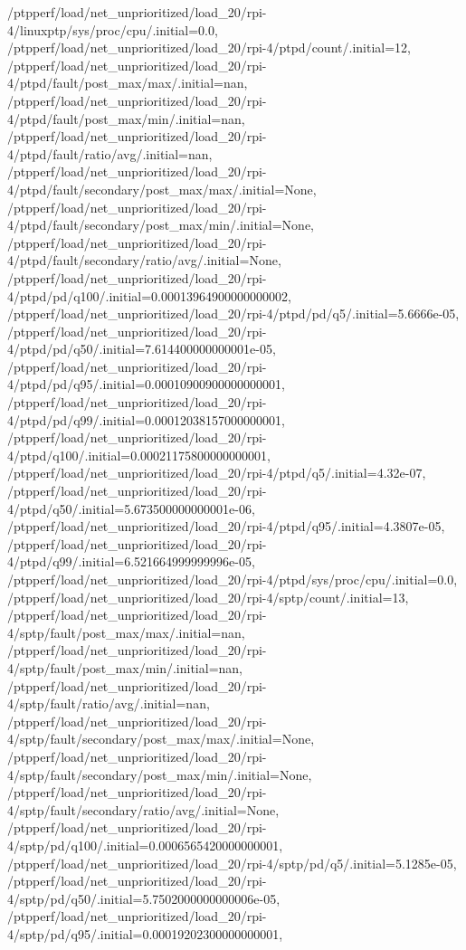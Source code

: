 {    /ptpperf/load/net_unprioritized/load_20/rpi-4/linuxptp/sys/proc/cpu/.initial=0.0,
    /ptpperf/load/net_unprioritized/load_20/rpi-4/ptpd/count/.initial=12,
    /ptpperf/load/net_unprioritized/load_20/rpi-4/ptpd/fault/post_max/max/.initial=nan,
    /ptpperf/load/net_unprioritized/load_20/rpi-4/ptpd/fault/post_max/min/.initial=nan,
    /ptpperf/load/net_unprioritized/load_20/rpi-4/ptpd/fault/ratio/avg/.initial=nan,
    /ptpperf/load/net_unprioritized/load_20/rpi-4/ptpd/fault/secondary/post_max/max/.initial=None,
    /ptpperf/load/net_unprioritized/load_20/rpi-4/ptpd/fault/secondary/post_max/min/.initial=None,
    /ptpperf/load/net_unprioritized/load_20/rpi-4/ptpd/fault/secondary/ratio/avg/.initial=None,
    /ptpperf/load/net_unprioritized/load_20/rpi-4/ptpd/pd/q100/.initial=0.00013964900000000002,
    /ptpperf/load/net_unprioritized/load_20/rpi-4/ptpd/pd/q5/.initial=5.6666e-05,
    /ptpperf/load/net_unprioritized/load_20/rpi-4/ptpd/pd/q50/.initial=7.614400000000001e-05,
    /ptpperf/load/net_unprioritized/load_20/rpi-4/ptpd/pd/q95/.initial=0.00010900900000000001,
    /ptpperf/load/net_unprioritized/load_20/rpi-4/ptpd/pd/q99/.initial=0.00012038157000000001,
    /ptpperf/load/net_unprioritized/load_20/rpi-4/ptpd/q100/.initial=0.00021175800000000001,
    /ptpperf/load/net_unprioritized/load_20/rpi-4/ptpd/q5/.initial=4.32e-07,
    /ptpperf/load/net_unprioritized/load_20/rpi-4/ptpd/q50/.initial=5.673500000000001e-06,
    /ptpperf/load/net_unprioritized/load_20/rpi-4/ptpd/q95/.initial=4.3807e-05,
    /ptpperf/load/net_unprioritized/load_20/rpi-4/ptpd/q99/.initial=6.521664999999996e-05,
    /ptpperf/load/net_unprioritized/load_20/rpi-4/ptpd/sys/proc/cpu/.initial=0.0,
    /ptpperf/load/net_unprioritized/load_20/rpi-4/sptp/count/.initial=13,
    /ptpperf/load/net_unprioritized/load_20/rpi-4/sptp/fault/post_max/max/.initial=nan,
    /ptpperf/load/net_unprioritized/load_20/rpi-4/sptp/fault/post_max/min/.initial=nan,
    /ptpperf/load/net_unprioritized/load_20/rpi-4/sptp/fault/ratio/avg/.initial=nan,
    /ptpperf/load/net_unprioritized/load_20/rpi-4/sptp/fault/secondary/post_max/max/.initial=None,
    /ptpperf/load/net_unprioritized/load_20/rpi-4/sptp/fault/secondary/post_max/min/.initial=None,
    /ptpperf/load/net_unprioritized/load_20/rpi-4/sptp/fault/secondary/ratio/avg/.initial=None,
    /ptpperf/load/net_unprioritized/load_20/rpi-4/sptp/pd/q100/.initial=0.0006565420000000001,
    /ptpperf/load/net_unprioritized/load_20/rpi-4/sptp/pd/q5/.initial=5.1285e-05,
    /ptpperf/load/net_unprioritized/load_20/rpi-4/sptp/pd/q50/.initial=5.7502000000000006e-05,
    /ptpperf/load/net_unprioritized/load_20/rpi-4/sptp/pd/q95/.initial=0.00019202300000000001,
}
